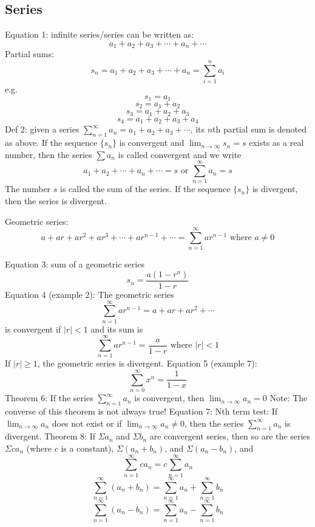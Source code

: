 \documentclass{article}
\begin{document}
    \subsection{Series}
    \begin{outline}
        \1 Equation 1: infinite series/series can be written as: \[a_1+a_2+a_3+\cdots+a_n+\cdots\]
        \1 Partial sums: \[s_n=a_1+a_2+a_3+\cdots+a_n=\sum^n_{i=1}a_i\] e.g. \[s_1=a_1\]\[s_2=a_1+a_2\]\[s_3=a_1+a_2+a_3\]\[s_4=a_1+a_2+a_3+a_4\]
        \1 Def 2: given a series \(\sum^\infty_{n=1}a_n=a_1+a_2+a_3+\cdots\), its $n$th partial sum is denoted as above.
            \2 If the sequence \(\{s_n\}\) is convergent and \(\lim_{n\to\infty}s_n=s\) exists as a real number, then the series \(\sum a_n\) is called convergent and we write \[a_1+a_2+\cdots+a_n+\cdots=s\mbox{ or }\sum^\infty_{n=1}a_n=s\]
            \2 The number $s$ is called the sum of the series. If the sequence \(\{s_n\}\) is divergent, then the series is divergent. 
        \end{outline}
        \begin{outline}
            \1 Geometric series: \[a+ar+ar^2+ar^3+\cdots+ar^{n-1}+\cdots=\sum^\infty_{n=1}ar^{n-1}\mbox{ where }a\neq0\]
        \end{outline}
            \begin{outline}
        \1 Equation 3: sum of a geometric series \[s_n=\dfrac{a\left(1-r^n\right)}{1-r}\]
        \1 Equation 4 (example 2): The geometric series \[\sum^\infty_{n=1}ar^{n-1}=a+ar+ar^2+\cdots\] is convergent if \(|r|<1\) and its sum is \[\sum^\infty_{n=1}ar^{n-1}=\dfrac{a}{1-r}\mbox{ where }|r|<1\] If \(|r|\geq1\), the geometric series is divergent. 
        \1 Equation 5 (example 7): \[\sum^\infty_{n=0}x^n=\dfrac{1}{1-x}\]
        \1 Theorem 6: If the series \(\sum^\infty_{n=1}a_n\) is convergent, then \(\lim_{n\to\infty}a_n=0\)
            \2 Note: The converse of this theorem is not always true!
        \1 Equation 7: Nth term test: If \(\lim_{n\to\infty}a_n\) does not exist or if \(\lim_{n\to\infty}a_n\neq0\), then the series \(\sum_{n=1}^\infty a_n\) is divergent. 
        \1 Theorem 8: If \(\Sigma a_n\) and \(\Sigma b_n\) are convergent series, then so are the series \(\Sigma ca_n\) (where $c$ is a constant), \(\Sigma\left(a_n+b_n\right)\), and \(\Sigma\left(a_n-b_n\right)\), and \[\sum^\infty_{n=1}ca_n=c\sum^\infty_{n=1}a_n\]\[\sum^\infty_{n=1}\left(a_n+b_n\right)=\sum^\infty_{n=1}a_n+\sum^\infty_{n=1}b_n\]\[\sum^\infty_{n=1}\left(a_n-b_n\right)=\sum^\infty_{n=1}a_n-\sum^\infty_{n=1}b_n\]

    \end{outline}
\end{document}

